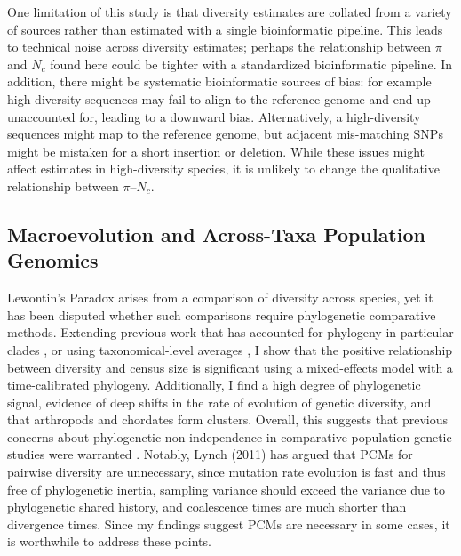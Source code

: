 \documentclass[9pt,lineno]{elife}
\begin{document}
One limitation of this study is that diversity estimates are collated from a
variety of sources rather than estimated with a single bioinformatic pipeline.
This leads to technical noise across diversity estimates; perhaps the
relationship between $\pi$ and $N_c$ found here could be tighter with a
standardized bioinformatic pipeline. In addition, there might be systematic
bioinformatic sources of bias: for example high-diversity sequences may fail to
align to the reference genome and end up unaccounted for, leading to a downward
bias.  Alternatively, a high-diversity sequences might map to the reference
genome, but adjacent mis-matching SNPs might be mistaken for a short insertion
or deletion.  While these issues might affect estimates in high-diversity
species, it is unlikely to change the qualitative relationship between
$\pi$--$N_c$.

\subsection{Macroevolution and Across-Taxa Population Genomics}


Lewontin's Paradox arises from a comparison of diversity across species, yet it
has been disputed whether such comparisons require phylogenetic comparative
methods. Extending previous work that has accounted for phylogeny in particular
clades \citep{Leffler2012-zj}, or using taxonomical-level averages
\citep{Romiguier2014-bp}, I show that the positive relationship between
diversity and census size is significant using a mixed-effects model with a
time-calibrated phylogeny. Additionally, I find a high degree of phylogenetic
signal, evidence of deep shifts in the rate of evolution of genetic diversity,
and that arthropods and chordates form clusters. Overall, this suggests that
previous concerns about phylogenetic non-independence in comparative population
genetic studies were warranted \citep{Gillespie1991-qa,Whitney2010-ud}.
Notably, Lynch (2011) has argued that PCMs for pairwise diversity are
unnecessary, since mutation rate evolution is fast and thus free of
phylogenetic inertia, sampling variance should exceed the variance due to
phylogenetic shared history, and coalescence times are much shorter than
divergence times. Since my findings suggest PCMs are necessary in some cases,
it is worthwhile to address these points. 
\end{document}
